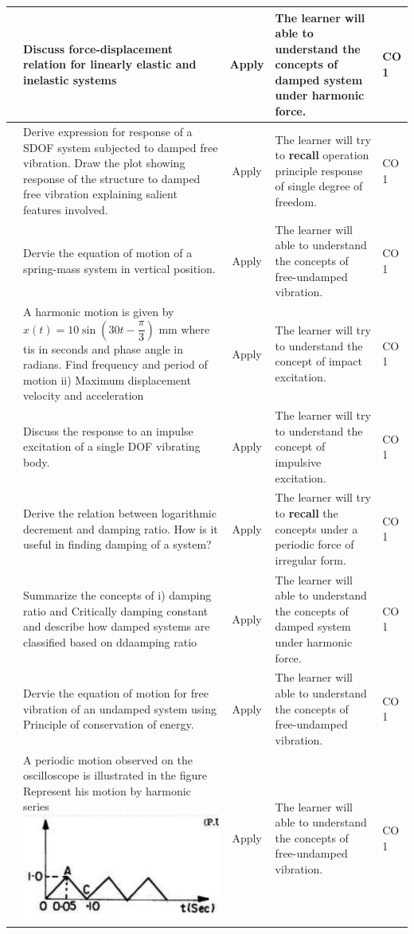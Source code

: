 \documentclass[11pt,paper=a4,answers]{exam}
\begin{document}
\begin{flushleft}
\begin{longtable}{|>{\centering\arraybackslash}p{0.8cm}  | >{\raggedright\arraybackslash}p{6.5cm}  | c | >{\raggedright\arraybackslash}p{5cm} |>{\centering\arraybackslash}p{1cm}|}
		3&	Discuss force-displacement relation for linearly elastic and inelastic systems&	Apply&	The learner will able to understand the concepts of damped system under harmonic force.&	CO 1\\
		\hline 
		4&Derive expression for response of a SDOF system subjected to damped free vibration.
		Draw the plot showing response of the structure to damped free vibration explaining
		salient features involved. &		Apply&	The learner will try to \textbf{recall} operation principle response of single degree of freedom.&	CO 1\\
		\hline 
		5&	Dervie the equation of motion of a spring-mass system in vertical position.	&	Apply&	The learner will able to understand the concepts of free-undamped vibration.&	CO 1\\
		\hline 
		6& A harmonic motion is given by $x(t)=10 \sin (30t-\dfrac{\pi}{3})$ mm where tis in seconds and phase angle in radians. Find frequency and period of motion ii) Maximum displacement velocity and acceleration
 &	Apply&	The learner will try to understand the concept of impact excitation. &	CO 1\\
		\hline 
		7&	Discuss the response to an impulse excitation of a single DOF vibrating body.&	Apply&	The learner will try to understand the concept of impulsive excitation.&	CO 1\\
		\hline 
		8& Derive the relation between logarithmic decrement and damping ratio. How is it useful
		in finding damping of a system?	 	&	Apply&	The learner will try to \textbf{recall} the concepts under a periodic force of irregular form.  &	CO 1\\
		\hline 
		9&Summarize the concepts of i) damping ratio  and Critically damping constant  and describe how damped systems are classified based on ddaamping ratio	&	Apply&	The learner will able to understand the concepts of damped system under harmonic force.&	CO 1\\
		\hline 
		10& Dervie the equation of motion for free vibration of an undamped system using Principle of conservation of energy.	&	Apply&	The learner will able to understand the concepts of free-undamped vibration.&	CO 1\\
		\hline   
	11& A periodic motion observed  on the oscilloscope is illustrated in the figure Represent his motion by harmonic series\includegraphics[scale=0.5]{5.png}	&	Apply&	The learner will able to understand the concepts of free-undamped vibration.&	CO 1\\

\end{longtable}
\end{flushleft}
\end{document}
